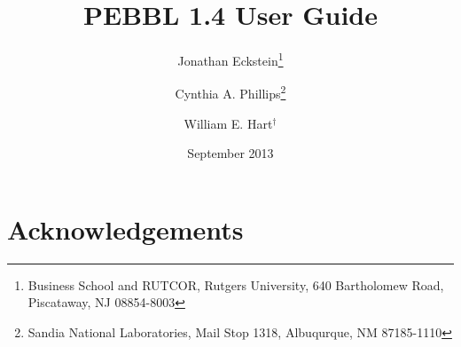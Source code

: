 \documentclass[12pt]{article}
\begin{document}
\title{
PEBBL 1.4 User Guide
}

\author{
Jonathan Eckstein\thanks{
Business School and RUTCOR, Rutgers University,
640 Bartholomew Road, Piscataway, NJ 08854-8003
}
\and
Cynthia A. Phillips\thanks{
Sandia National Laboratories, Mail Stop 1318, Albuqurque, NM 87185-1110}
\and
William E. Hart$^{\dagger}$
}

\date{September 2013}

\maketitle

\begin{abstract}

\end{abstract}

\newpage

\tableofcontents

\newpage



\section*{Acknowledgements}





\end{document}
